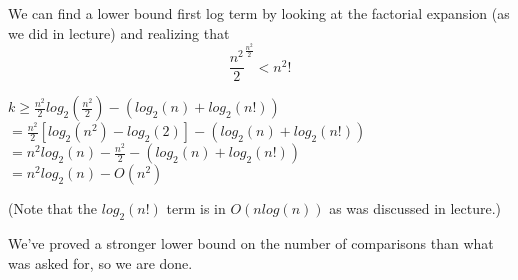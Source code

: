 \documentclass[11pt,letterpaper]{article}
\begin{document}
We can find a lower bound first log term by looking at the factorial expansion (as we did in lecture) and realizing that
$$\frac{n^2}{2}^\frac{n^2}{2} < n^2!$$

$k \geq \frac{n^2}{2} log_2(\frac{n^2}{2}) - (log_2(n) + log_2(n!))$ \\
$     = \frac{n^2}{2} [log_2(n^2) - log_2(2)] - (log_2(n) + log_2(n!))$ \\
$     = n^2 log_2(n) - \frac{n^2}{2} - (log_2(n) + log_2(n!))$ \\
$     = n^2 log_2(n) - O(n^2)$

(Note that the $log_2(n!)$ term is in $O(n log(n))$ as was discussed in lecture.)

We've proved a stronger lower bound on the number of comparisons than what was asked for, so we are done.
\end{document}
